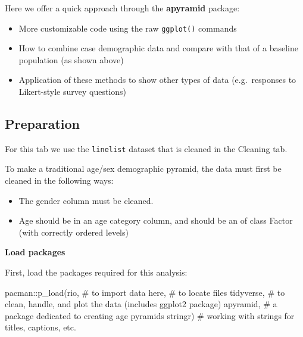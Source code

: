 \documentclass[
]{article}
\newenvironment{Shaded}{\begin{snugshade}}{\end{snugshade}}
\newcommand{\CommentTok}[1]{\textcolor[rgb]{0.50,0.62,0.50}{#1}}
\newcommand{\KeywordTok}[1]{\textcolor[rgb]{0.94,0.87,0.69}{#1}}
\newcommand{\NormalTok}[1]{\textcolor[rgb]{0.80,0.80,0.80}{#1}}
\newcommand{\OperatorTok}[1]{\textcolor[rgb]{0.94,0.94,0.82}{#1}}
\providecommand{\tightlist}{%
  \setlength{\itemsep}{0pt}\setlength{\parskip}{0pt}}
\begin{document}
Here we offer a quick approach through the \textbf{apyramid} package:

\begin{itemize}
\tightlist
\item
  More customizable code using the raw \texttt{ggplot()} commands\\
\item
  How to combine case demographic data and compare with that of a
  baseline population (as shown above)\\
\item
  Application of these methods to show other types of data
  (e.g.~responses to Likert-style survey questions)
\end{itemize}

\hypertarget{preparation}{%
\subsection{Preparation}\label{preparation}}

For this tab we use the \texttt{linelist} dataset that is cleaned in the
Cleaning tab.

To make a traditional age/sex demographic pyramid, the data must first
be cleaned in the following ways:

\begin{itemize}
\tightlist
\item
  The gender column must be cleaned.\\
\item
  Age should be in an age category column, and should be an of class
  Factor (with correctly ordered levels)
\end{itemize}

\textbf{Load packages}

First, load the packages required for this analysis:

\begin{Shaded}
\begin{Highlighting}[]
\NormalTok{pacman}\OperatorTok{::}\KeywordTok{p\_load}\NormalTok{(rio,       }\CommentTok{\# to import data}
\NormalTok{               here,      }\CommentTok{\# to locate files}
\NormalTok{               tidyverse, }\CommentTok{\# to clean, handle, and plot the data (includes ggplot2 package)}
\NormalTok{               apyramid,  }\CommentTok{\# a package dedicated to creating age pyramids}
\NormalTok{               stringr)   }\CommentTok{\# working with strings for titles, captions, etc.}
\end{Highlighting}
\end{Shaded}
\end{document}

